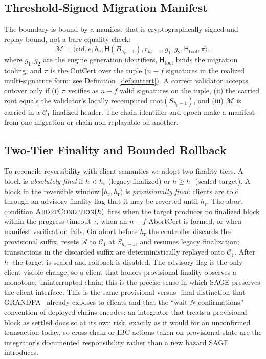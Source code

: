 \documentclass[journal]{IEEEtran}
\theoremstyle{definition}
\theoremstyle{remark}
\begin{document}
\subsection{Threshold-Signed Migration Manifest}
The boundary is bound by a manifest that is cryptographically signed and replay-bound, not a
bare equality check:
\begin{equation}
\mathcal{M} = \big\langle \mathrm{cid}, e, h_{\mathrm{c}}, \mathsf{H}(B_{h_{\mathrm{c}}-1}),
r_{h_{\mathrm{c}}-1}, g_1, g_2, \mathsf{H}_{\mathrm{tool}}, \pi \big\rangle,
\end{equation}
where $g_1,g_2$ are the engine generation identifiers, $\mathsf{H}_{\mathrm{tool}}$ binds the
migration tooling, and $\pi$ is the CutCert over the tuple ($n-f$ signatures in the realized
multi-signature form; see Definition~\ref{def:cutcert}). A
correct validator accepts cutover only if (i) $\pi$ verifies as $n-f$ valid signatures on the tuple,
(ii) the carried root equals the validator's locally recomputed
$\mathrm{root}(S_{h_{\mathrm{c}}-1})$, and (iii) $\mathcal{M}$ is carried in a
$\mathcal{C}_1$-finalized header. The chain identifier and epoch make a manifest from one
migration or chain non-replayable on another.

\subsection{Two-Tier Finality and Bounded Rollback}
To reconcile reversibility with client semantics we adopt two finality tiers. A block is
\emph{absolutely final} if $h < h_{\mathrm{c}}$ (legacy-finalized) or $h \ge h_{\mathrm{r}}$
(sealed target). A block in the reversible window $[h_{\mathrm{c}}, h_{\mathrm{r}})$ is
\emph{provisionally final}: clients are told through an advisory finality flag that it may be
reverted until $h_{\mathrm{r}}$. The abort condition $\textsc{AbortCondition}(h)$ fires when
the target produces no finalized block within the progress timeout $\tau$, when an $n-f$
AbortCert is formed, or when manifest verification fails. On abort before $h_{\mathrm{r}}$ the
controller discards the provisional suffix, resets $\mathcal{A}$ to $\mathcal{C}_1$ at
$S_{h_{\mathrm{c}}-1}$, and resumes legacy finalization; transactions in the discarded suffix
are deterministically replayed onto $\mathcal{C}_1$. After $h_{\mathrm{r}}$ the target is
sealed and rollback is disabled. The advisory flag is the only client-visible change, so a
client that honors provisional finality observes a monotone, uninterrupted chain; this is the
precise sense in which SAGE preserves the client interface. This is the same provisional-versus-
final distinction that GRANDPA~\cite{grandpa} already exposes to clients and that the
``wait-$N$-confirmations'' convention of deployed chains encodes: an integrator that treats a
provisional block as settled does so at its own risk, exactly as it would for an unconfirmed
transaction today, so cross-chain or IBC actions taken on provisional state are the integrator's
documented responsibility rather than a new hazard SAGE introduces.
\end{document}
